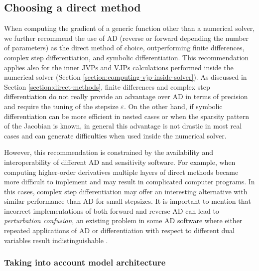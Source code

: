 
\subsection*{Choosing a direct method}

When computing the gradient of a generic function other than a numerical solver, we further recommend the use of AD (reverse or forward depending the number of parameters) as the direct method of choice, outperforming finite differences, complex step differentiation, and symbolic differentiation. 
This recommendation applies also for the inner JVPs and VJPs calculations performed inside the numerical solver (Section \ref{section:computing-vjp-inside-solver}).
As discussed in Section \ref{section:direct-methods}, finite differences and complex step differentiation do not really provide an advantage over AD in terms of precision and require the tuning of the stepsize $\varepsilon$. 
On the other hand, if symbolic differentiation can be more efficient in nested cases or when the sparsity pattern of the Jacobian is known, in general this advantage is not drastic in most real cases and can generate difficulties when used inside the numerical solver. 

However, this recommendation is constrained by the availability and interoperability of different AD and sensitivity software. 
For example, when computing higher-order derivatives multiple layers of direct methods became more difficult to implement and may result in complicated computer programs.
In this cases, complex step differentiation may offer an interesting alternative with similar performance than AD for small stepsizes. 
It is important to mention that incorrect implementations of both forward and reverse AD can lead to \textit{perturbation confusion}, an existing problem in some AD software where either repeated applications of AD or differentiation with respect to different dual variables result indistinguishable \cite{siskind2005perturbation, manzyuk2019perturbation}. 


\subsubsection*{Taking into account model architecture}

